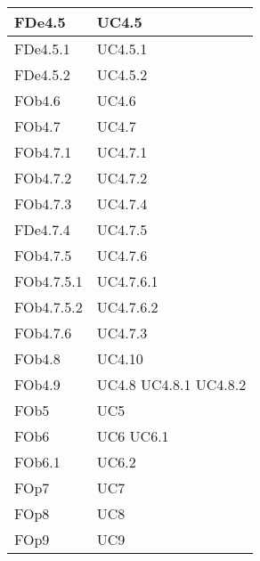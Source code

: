\begin{longtable}{|l|p{4cm}|}
\hline
FDe4.5 & UC4.5 \linebreak  \\ 
\hline
FDe4.5.1 & UC4.5.1 \linebreak  \\ 
\hline
FDe4.5.2 & UC4.5.2 \linebreak  \\ 
\hline
FOb4.6 & UC4.6 \linebreak  \\ 
\hline
FOb4.7 & UC4.7 \linebreak  \\ 
\hline
FOb4.7.1 & UC4.7.1 \linebreak  \\ 
\hline
FOb4.7.2 & UC4.7.2 \linebreak  \\ 
\hline
FOb4.7.3 & UC4.7.4 \linebreak  \\ 
\hline
FDe4.7.4 & UC4.7.5 \linebreak  \\ 
\hline
FOb4.7.5 & UC4.7.6 \linebreak  \\ 
\hline
FOb4.7.5.1 & UC4.7.6.1 \linebreak  \\ 
\hline
FOb4.7.5.2 & UC4.7.6.2 \linebreak  \\ 
\hline
FOb4.7.6 & UC4.7.3 \linebreak  \\ 
\hline
FOb4.8 & UC4.10 \linebreak  \\ 
\hline
FOb4.9 & UC4.8 \linebreak  UC4.8.1 \linebreak  UC4.8.2 \linebreak  \\ 
\hline
FOb5 & UC5 \linebreak \\ 
\hline
FOb6 & UC6 \linebreak UC6.1 \linebreak \\ 
\hline
FOb6.1 & UC6.2 \linebreak  \\ 
\hline
FOp7 & UC7 \linebreak \\ 
\hline
FOp8 & UC8 \linebreak \\ 
\hline
FOp9 & UC9 \linebreak \\ 

\end{longtable}
